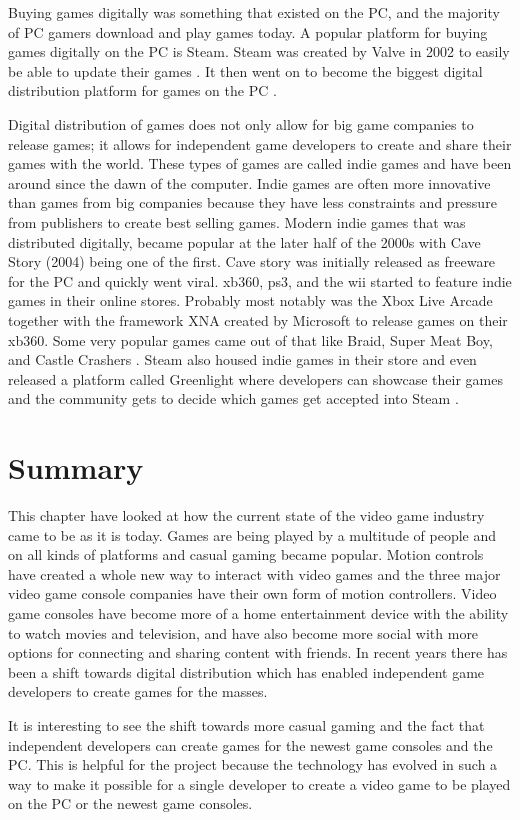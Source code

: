 Buying games digitally was something that existed on the PC, and the majority of PC gamers download and play games today. A popular platform for buying games digitally on the PC is Steam. Steam was created by Valve in 2002 to easily be able to update their games \cite{2012eurogamer}. It then went on to become the biggest digital distribution platform for games on the PC \cite{2009gamasutra}.

Digital distribution of games does not only allow for big game companies to release games; it allows for independent game developers to create and share their games with the world. These types of games are called indie games and have been around since the dawn of the computer. Indie games are often more innovative than games from big companies because they have less constraints and pressure from publishers to create best selling games. Modern indie games that was distributed digitally, became popular at the later half of the 2000s with Cave Story (2004) being one of the first. Cave story was initially released as freeware for the PC and quickly went viral. \gls{xb360}, \gls{ps3}, and the \gls{wii} started to feature indie games in their online stores. Probably most notably was the Xbox Live Arcade together with the framework XNA created by Microsoft to release games on their \gls{xb360}. Some very popular games came out of that like Braid, Super Meat Boy, and Castle Crashers \cite{2015eurogamer}. Steam also housed indie games in their store and even released a platform called Greenlight where developers can showcase their games and the community gets to decide which games get accepted into Steam \cite{2015watlington}.

\section{Summary}
This chapter have looked at how the current state of the video game industry came to be as it is today. Games are being played by a multitude of people and on all kinds of platforms and casual gaming became popular.
Motion controls have created a whole new way to interact with video games and the three major video game console companies have their own form of motion controllers.
Video game consoles have become more of a home entertainment device with the ability to watch movies and television, and have also become more social with more options for connecting and sharing content with friends. 
In recent years there has been a shift towards digital distribution which has enabled independent game developers to create games for the masses.

It is interesting to see the shift towards more casual gaming and the fact that independent developers can create games for the newest game consoles and the PC. This is helpful for the project because the technology has evolved in such a way to make it possible for a single developer to create a video game to be played on the PC or the newest game consoles.

